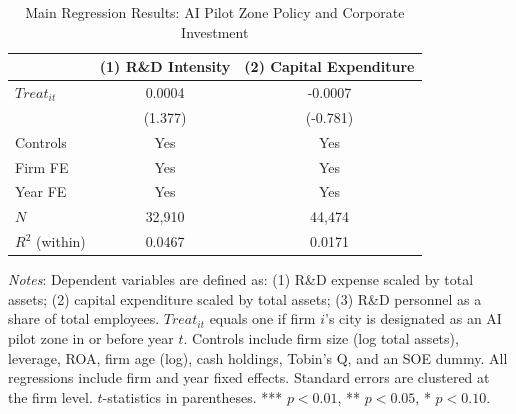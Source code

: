 \begin{table}[htbp]
\centering
\caption{Main Regression Results: AI Pilot Zone Policy and Corporate Investment}
\label{tab:main}
\begin{threeparttable}
\begin{tabular}{lcc}
\toprule
 & (1) R\&D Intensity & (2) Capital Expenditure \\
\midrule
$Treat_{it}$ & 0.0004 & -0.0007 \\
 & (1.377) & (-0.781) \\
\midrule
Controls & Yes & Yes \\
Firm FE & Yes & Yes \\
Year FE & Yes & Yes \\
\midrule
$N$ & 32,910 & 44,474 \\
$R^2$ (within) & 0.0467 & 0.0171 \\
\bottomrule
\end{tabular}
\begin{tablenotes}
\small
\item \textit{Notes}: Dependent variables are defined as: (1) R\&D expense scaled by total assets; (2) capital expenditure scaled by total assets; (3) R\&D personnel as a share of total employees. $Treat_{it}$ equals one if firm $i$'s city is designated as an AI pilot zone in or before year $t$. Controls include firm size (log total assets), leverage, ROA, firm age (log), cash holdings, Tobin's Q, and an SOE dummy. All regressions include firm and year fixed effects. Standard errors are clustered at the firm level. $t$-statistics in parentheses. *** $p<0.01$, ** $p<0.05$, * $p<0.10$.
\end{tablenotes}
\end{threeparttable}
\end{table}
